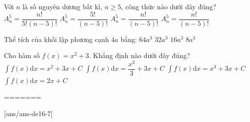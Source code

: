 \begin{ex}%
Với $n$ là số nguyên dương bất kì, $n \geq 5$, công thức nào dưới dây đúng?
\choice
{$A_n^5=\dfrac{n !}{5!(n-5) !}$}
{$A_n^5=\dfrac{5!}{(n-5) !}$}
{\True $A_n^5=\dfrac{n !}{(n-5) !}$}
{$A_n^5=\dfrac{n !}{(n-5) !}$}

\end{ex}
\begin{ex}%
Thể tích của khối lập phương cạnh $4 a$ bằng:
\choice
{\True $64 a^3$}
{$32 a^3$}
{$16 a^3$}
{$8 a^3$}
\end{ex}
\begin{ex}%
Cho hàm số $f(x)=x^2+3$. Khẳng định nào dưới đây đúng?
\choice
{$\displaystyle\int f(x) \mathrm{d} x=x^2+3 x+C$}
{\True $\displaystyle\int f(x) \mathrm{d} x=\dfrac{x^3}{3}+3 x+C$}
{$\displaystyle\int f(x) \mathrm{d} x=x^3+3 x+C$}
{$\displaystyle\int f(x) \mathrm{d} x=2 x+C$}
\end{ex}

=======

\begin{name}
	{\tenchude}
	{\tendethi}
	{\tentruong}
	{\thoigian}
\end{name}
[ans/ans-de16-7]

